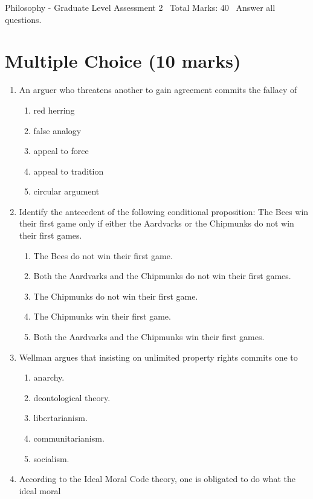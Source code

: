\documentclass[12pt]{article}
\begin{document}
\begin{center}
Philosophy - Graduate Level Assessment 2 \
Total Marks: 40 \
Answer all questions.
\end{center}

\section*{Multiple Choice (10 marks)}
\begin{enumerate}[label=\arabic*.]
\item An arguer who threatens another to gain agreement commits the fallacy of
\begin{enumerate}[label=(\alph*)]
    \item red herring
    \item false analogy
    \item appeal to force
    \item appeal to tradition
    \item circular argument
\end{enumerate}
\item Identify the antecedent of the following conditional proposition: The Bees win their first
game only if either the Aardvarks or the Chipmunks do not win their first games.
\begin{enumerate}[label=(\alph*)]
    \item The Bees do not win their first game.
    \item Both the Aardvarks and the Chipmunks do not win their first games.
    \item The Chipmunks do not win their first game.
    \item The Chipmunks win their first game.
    \item Both the Aardvarks and the Chipmunks win their first games.
\end{enumerate}
\item Wellman argues that insisting on unlimited property rights commits one to
\begin{enumerate}[label=(\alph*)]
    \item anarchy.
    \item deontological theory.
    \item libertarianism.
    \item communitarianism.
    \item socialism.
\end{enumerate}
\item According to the Ideal Moral Code theory, one is obligated to do what the ideal moral

\end{enumerate}
\end{document}
